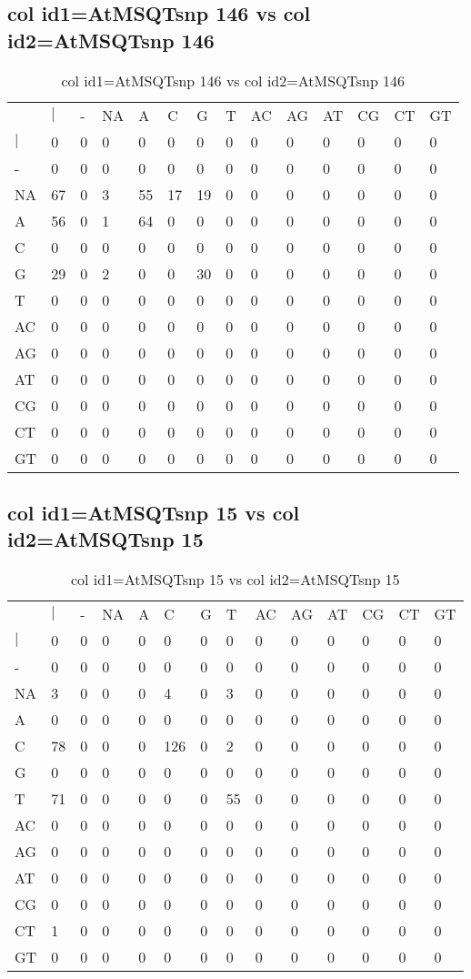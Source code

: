\subsection{col id1=AtMSQTsnp 146 vs col id2=AtMSQTsnp 146}
\begin{center}
\begin{longtable}{|l|l|l|l|l|l|l|l|l|l|l|l|l|l|}
\caption{col id1=AtMSQTsnp 146 vs col id2=AtMSQTsnp 146} \label{table_dm730}\\
\hline
\\
\hline
&$|$&-&NA&A&C&G&T&AC&AG&AT&CG&CT&GT\\
$|$&0&0&0&0&0&0&0&0&0&0&0&0&0\\
-&0&0&0&0&0&0&0&0&0&0&0&0&0\\
NA&67&0&3&55&17&19&0&0&0&0&0&0&0\\
A&56&0&1&64&0&0&0&0&0&0&0&0&0\\
C&0&0&0&0&0&0&0&0&0&0&0&0&0\\
G&29&0&2&0&0&30&0&0&0&0&0&0&0\\
T&0&0&0&0&0&0&0&0&0&0&0&0&0\\
AC&0&0&0&0&0&0&0&0&0&0&0&0&0\\
AG&0&0&0&0&0&0&0&0&0&0&0&0&0\\
AT&0&0&0&0&0&0&0&0&0&0&0&0&0\\
CG&0&0&0&0&0&0&0&0&0&0&0&0&0\\
CT&0&0&0&0&0&0&0&0&0&0&0&0&0\\
GT&0&0&0&0&0&0&0&0&0&0&0&0&0\\
\hline
\end{longtable}
\end{center}

\subsection{col id1=AtMSQTsnp 15 vs col id2=AtMSQTsnp 15}
\begin{center}
\begin{longtable}{|l|l|l|l|l|l|l|l|l|l|l|l|l|l|}
\caption{col id1=AtMSQTsnp 15 vs col id2=AtMSQTsnp 15} \label{table_dm732}\\
\hline
\\
\hline
&$|$&-&NA&A&C&G&T&AC&AG&AT&CG&CT&GT\\
$|$&0&0&0&0&0&0&0&0&0&0&0&0&0\\
-&0&0&0&0&0&0&0&0&0&0&0&0&0\\
NA&3&0&0&0&4&0&3&0&0&0&0&0&0\\
A&0&0&0&0&0&0&0&0&0&0&0&0&0\\
C&78&0&0&0&126&0&2&0&0&0&0&0&0\\
G&0&0&0&0&0&0&0&0&0&0&0&0&0\\
T&71&0&0&0&0&0&55&0&0&0&0&0&0\\
AC&0&0&0&0&0&0&0&0&0&0&0&0&0\\
AG&0&0&0&0&0&0&0&0&0&0&0&0&0\\
AT&0&0&0&0&0&0&0&0&0&0&0&0&0\\
CG&0&0&0&0&0&0&0&0&0&0&0&0&0\\
CT&1&0&0&0&0&0&0&0&0&0&0&0&0\\
GT&0&0&0&0&0&0&0&0&0&0&0&0&0\\
\hline
\end{longtable}
\end{center}

